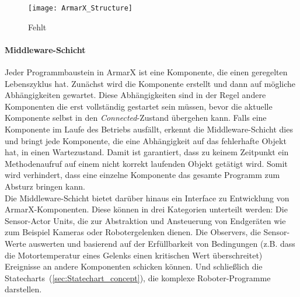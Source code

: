 \begin{figure}[h]
\begin{center}
\texttt{[image: ArmarX\_Structure]}
\caption{Fehlt}
\label{fig:ArmarX_structure}
\end{center}
\end{figure}

\paragraph{Middleware-Schicht} Jeder Programmbaustein in ArmarX ist eine Komponente, die einen geregelten Lebenszyklus hat. Zunächst wird die Komponente erstellt und dann auf mögliche Abhängigkeiten gewartet. Diese Abhängigkeiten sind in der Regel andere Komponenten die erst vollständig gestartet sein müssen, bevor die aktuelle Komponente selbst in den \textit{Connected}-Zustand übergehen kann. Falls eine Komponente im Laufe des Betriebs ausfällt, erkennt die Middleware-Schicht dies und bringt jede Komponente, die eine Abhängigkeit auf das fehlerhafte Objekt hat, in einen Wartezustand. Damit ist garantiert, dass zu keinem Zeitpunkt ein Methodenaufruf auf einem nicht korrekt laufenden Objekt getätigt wird. Somit wird verhindert, dass eine einzelne Komponente das gesamte Programm zum Absturz bringen kann. \\
Die Middleware-Schicht bietet darüber hinaus ein Interface zu Entwicklung von ArmarX-Komponenten. Diese können in drei Kategorien unterteilt werden: Die \glqq Sensor-Actor Units\grqq{}, die zur Abstraktion und Ansteuerung von Endgeräten wie zum Beispiel Kameras oder Robotergelenken dienen. Die \glqq Observers\grqq{}, die Sensor-Werte auswerten und basierend auf der Erfüllbarkeit von Bedingungen (z.B. dass die Motortemperatur eines Gelenks einen kritischen Wert überschreitet) Ereignisse an andere Komponenten schicken können. Und schließlich die \glqq Statecharts\grqq{}~(\ref{sec:Statechart_concept}), die komplexe Roboter-Programme darstellen.

